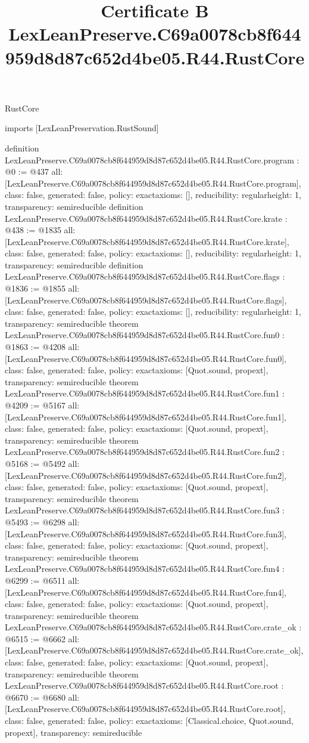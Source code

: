 \begin{lexlean}{RustCore}
\title{Certificate B LexLeanPreserve.C69a0078cb8f644959d8d87c652d4be05.R44.RustCore}
\begin{coremodule}
imports [LexLeanPreservation.RustSound]

definition LexLeanPreserve.C69a0078cb8f644959d8d87c652d4be05.R44.RustCore.program : @0 := @437 {
  all: [LexLeanPreserve.C69a0078cb8f644959d8d87c652d4be05.R44.RustCore.program],
  class: false,
  generated: false,
  policy: exact{axioms: []},
  reducibility: regular{height: 1},
  transparency: semireducible
}
definition LexLeanPreserve.C69a0078cb8f644959d8d87c652d4be05.R44.RustCore.krate : @438 := @1835 {
  all: [LexLeanPreserve.C69a0078cb8f644959d8d87c652d4be05.R44.RustCore.krate],
  class: false,
  generated: false,
  policy: exact{axioms: []},
  reducibility: regular{height: 1},
  transparency: semireducible
}
definition LexLeanPreserve.C69a0078cb8f644959d8d87c652d4be05.R44.RustCore.flags : @1836 := @1855 {
  all: [LexLeanPreserve.C69a0078cb8f644959d8d87c652d4be05.R44.RustCore.flags],
  class: false,
  generated: false,
  policy: exact{axioms: []},
  reducibility: regular{height: 1},
  transparency: semireducible
}
theorem LexLeanPreserve.C69a0078cb8f644959d8d87c652d4be05.R44.RustCore.fun0 : @1863 := @4208 {
  all: [LexLeanPreserve.C69a0078cb8f644959d8d87c652d4be05.R44.RustCore.fun0],
  class: false,
  generated: false,
  policy: exact{axioms: [Quot.sound, propext]},
  transparency: semireducible
}
theorem LexLeanPreserve.C69a0078cb8f644959d8d87c652d4be05.R44.RustCore.fun1 : @4209 := @5167 {
  all: [LexLeanPreserve.C69a0078cb8f644959d8d87c652d4be05.R44.RustCore.fun1],
  class: false,
  generated: false,
  policy: exact{axioms: [Quot.sound, propext]},
  transparency: semireducible
}
theorem LexLeanPreserve.C69a0078cb8f644959d8d87c652d4be05.R44.RustCore.fun2 : @5168 := @5492 {
  all: [LexLeanPreserve.C69a0078cb8f644959d8d87c652d4be05.R44.RustCore.fun2],
  class: false,
  generated: false,
  policy: exact{axioms: [Quot.sound, propext]},
  transparency: semireducible
}
theorem LexLeanPreserve.C69a0078cb8f644959d8d87c652d4be05.R44.RustCore.fun3 : @5493 := @6298 {
  all: [LexLeanPreserve.C69a0078cb8f644959d8d87c652d4be05.R44.RustCore.fun3],
  class: false,
  generated: false,
  policy: exact{axioms: [Quot.sound, propext]},
  transparency: semireducible
}
theorem LexLeanPreserve.C69a0078cb8f644959d8d87c652d4be05.R44.RustCore.fun4 : @6299 := @6511 {
  all: [LexLeanPreserve.C69a0078cb8f644959d8d87c652d4be05.R44.RustCore.fun4],
  class: false,
  generated: false,
  policy: exact{axioms: [Quot.sound, propext]},
  transparency: semireducible
}
theorem LexLeanPreserve.C69a0078cb8f644959d8d87c652d4be05.R44.RustCore.crate_ok : @6515 := @6662 {
  all: [LexLeanPreserve.C69a0078cb8f644959d8d87c652d4be05.R44.RustCore.crate_ok],
  class: false,
  generated: false,
  policy: exact{axioms: [Quot.sound, propext]},
  transparency: semireducible
}
theorem LexLeanPreserve.C69a0078cb8f644959d8d87c652d4be05.R44.RustCore.root : @6670 := @6680 {
  all: [LexLeanPreserve.C69a0078cb8f644959d8d87c652d4be05.R44.RustCore.root],
  class: false,
  generated: false,
  policy: exact{axioms: [Classical.choice, Quot.sound, propext]},
  transparency: semireducible
}


\end{coremodule}
\end{lexlean}
